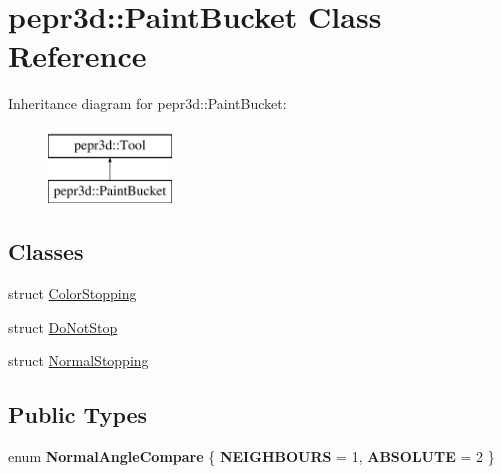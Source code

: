 \hypertarget{classpepr3d_1_1_paint_bucket}{}\section{pepr3d\+::Paint\+Bucket Class Reference}
\label{classpepr3d_1_1_paint_bucket}
Inheritance diagram for pepr3d\+::Paint\+Bucket\+:\begin{figure}[H]
\begin{center}
\leavevmode
\includegraphics[height=2.000000cm]{classpepr3d_1_1_paint_bucket}
\end{center}
\end{figure}
\subsection*{Classes}
\begin{DoxyCompactItemize}
\item 
struct \mbox{\hyperlink{structpepr3d_1_1_paint_bucket_1_1_color_stopping}{Color\+Stopping}}
\item 
struct \mbox{\hyperlink{structpepr3d_1_1_paint_bucket_1_1_do_not_stop}{Do\+Not\+Stop}}
\item 
struct \mbox{\hyperlink{structpepr3d_1_1_paint_bucket_1_1_normal_stopping}{Normal\+Stopping}}
\end{DoxyCompactItemize}
\subsection*{Public Types}
\begin{DoxyCompactItemize}
\item 
\mbox{\label{classpepr3d_1_1_paint_bucket_a9e31fe563fd8e90416c17e18ab58b8a3}} 
enum {\bfseries Normal\+Angle\+Compare} \{ {\bfseries N\+E\+I\+G\+H\+B\+O\+U\+RS} = 1, 
{\bfseries A\+B\+S\+O\+L\+U\+TE} = 2
 \}
\end{DoxyCompactItemize}
